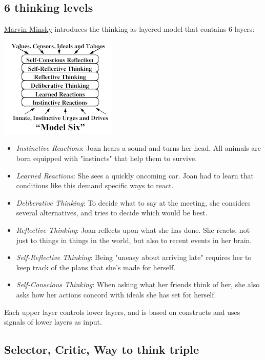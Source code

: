 \documentclass{acm_proc_article-sp}
\begin{document}
\subsection{6 thinking levels}

\href{http://web.media.mit.edu/~minsky/E5/eb5.html}{Marvin Minsky} introduces the thinking as layered model that contains 6 layers:

\includegraphics[scale=0.9]{model_6.png}

\begin{itemize}
 \item \emph{Instinctive Reactions}:  Joan hears a sound and turns her head. All animals are born equipped with "instincts" that help them to survive.
 \item \emph{Learned Reactions}: She sees a quickly oncoming car. Joan had to learn that conditions like this demand specific ways to react.
 \item \emph{Deliberative Thinking}: To decide what to say at the meeting, she considers several alternatives, and tries to decide which would be best.
 \item \emph{Reflective Thinking}: Joan reflects upon what she has done. She reacts, not just to things in things in the world, but also to recent events in her brain.
 \item \emph{Self-Reflective Thinking}: Being "uneasy about arriving late" requires her to keep track of the plans that she's made for herself.
 \item \emph{Self-Conscious Thinking}: When asking what her friends think of her, she also asks how her actions concord with ideals she has set for herself.
\end{itemize}

Each upper layer controls lower layers, and is based on constructs and uses signals of lower layers as input.

\subsection{Selector, Critic, Way to think triple}
\end{document}
